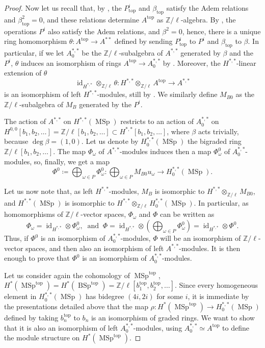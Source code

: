 \documentclass[10pt]{amsart}
\theoremstyle{definition}
\theoremstyle{plain}
\numberwithin{equation}{section}
\newcommand{\0}{\emptyset}
\newcommand{\MSp}{{\operatorname{MSp}}}
\newcommand{\BSp}{{\operatorname{BSp}}}
\renewcommand{\deg}{{\operatorname{deg}}}
\renewcommand{\top}{{\operatorname{top}}}
\newcommand{\id}{{\operatorname{id}}}
\begin{document}
\begin{proof}
    Now let us recall that, by \cite[Chapter 6, Section 1]{steenrod:cohomology}, the $P_{\top}^i$ and $\beta_{\top}$ satisfy the Adem relations and $\beta_{\top}^2=0$, and these relations determine $A^{\top}$ as $\mathbb{Z}/\ell$-algebra. By \cite[Theorem 5.1]{Hoy:Steenrod}, the operations $P^i$ also satisfy the Adem relations, and $\beta^2=0$, hence, there is a unique ring homomorphism $\theta:A^{\top}\to A^{**}$ defined by sending $P_{\top}^i$ to $P^i$ and $\beta_{\top}$ to $\beta$. In particular, if we let $A^{*,*}_0$ be the $\mathbb{Z}/\ell$-subalgebra of $A^{*,*}$ generated by $\beta$ and the $P^i$, $\theta$ induces an isomorphism of rings $A^{\top} \to A^{*,*}_0$ by \cite[Lemma 4.1 (1)]{lev:ellcoh}. Moreover, the $H^{*,*}$-linear extension of $\theta$
    $$\id_{H^{*,*}}\otimes_{\mathbb{Z}/\ell}\theta: H^{*,*}\otimes_{\mathbb{Z}/\ell}A^{\top}\to A^{*,*}$$
    is an isomorphism of left $H^{*,*}$-modules, still by \cite[Lemma 4.1]{lev:ellcoh}. We similarly define $M_{B0}$ as the $\mathbb{Z}/\ell$-subalgebra of $M_B$ generated by the $P^i$.
    
    The action of $A^{*,*}$ on $H^{*,*}(\MSp)$ restricts to an action of $A^{*,*}_0$ on $H^{0,0}[b_1,b_2,\ldots]=\mathbb{Z}/\ell[b_1,b_2,\ldots] \subset H^{*,*}[b_1,b_2,\ldots]$, where $\beta$ acts trivially, because $\deg\beta=(1,0)$. Let us denote by $H_0^{*,*}(\MSp)$ the bigraded ring $\mathbb{Z}/\ell[b_1,b_2,\ldots]$. The map $\Phi_{\omega}$ of $A^{*,*}$-modules induces then a map $\Phi_{\omega}^0$ of $A_0^{*,*}$-modules, so, finally, we get a map
    $$\Phi^0 \coloneqq \bigoplus_{\omega \in P} \Phi_{\omega}^0:\bigoplus_{\omega \in P}M_{B0}u_{\omega}\to H^{*,*}_0(\MSp).$$
    
    Let us now note that, as left $H^{*,*}$-modules, $M_B$ is isomorphic to $H^{*,*}\otimes_{\mathbb{Z}/\ell} M_{B0}$, and $H^{*,*}(\MSp)$ is isomorphic to $H^{*,*}\otimes_{\mathbb{Z}/\ell}H^{*,*}_0(\MSp)$. In particular, as homomorphisms of $\mathbb{Z}/\ell$-vector spaces, $\Phi_{\omega}$ and $\Phi$ can be written as $$\Phi_{\omega}=\id_{H^{*,*}}\otimes \Phi_{\omega}^0, \; \; \text{and} \; \; \Phi=\id_{H^{*,*}}\otimes(\bigoplus_{\omega \in P} \Phi_{\omega}^0)=\id_{H^{*,*}}\otimes \Phi^0.$$
    Thus, if $\Phi^0$ is an isomorphism of $A^{*,*}_0$-modules, $\Phi$ will be an isomorphism of $\mathbb{Z}/\ell$-vector spaces, and then also an isomorphism of left $A^{*,*}$-modules. It is then enough to prove that $\Phi^0$ is an isomorphism of $A^{*,*}_0$-modules.

    Let us consider again the cohomology of $\MSp^{\top}$, $H^*(\MSp^{\top})=H^*(\BSp^{\top})=\mathbb{Z}/\ell[b_1^{\top},b_2^{\top},\ldots]$. Since every homogeneous element in $H_0^{*,*}(\MSp)$ has bidegree $(4i,2i)$ for some $i$, it is immediate by the presentations detailed above that the map $\rho:H^*(\MSp^{\top})\to H^{*,*}_0(\MSp)$ defined by taking $b_n^{\top}$ to $b_n$ is an isomorphism of graded rings. We want to show that it is also an isomorphism of left $A^{*,*}_0$-modules, using $A^{*,*}_0\simeq A^{\top}$ to define the module structure on $H^*(\MSp^{\top})$.


\end{proof}
\end{document}
